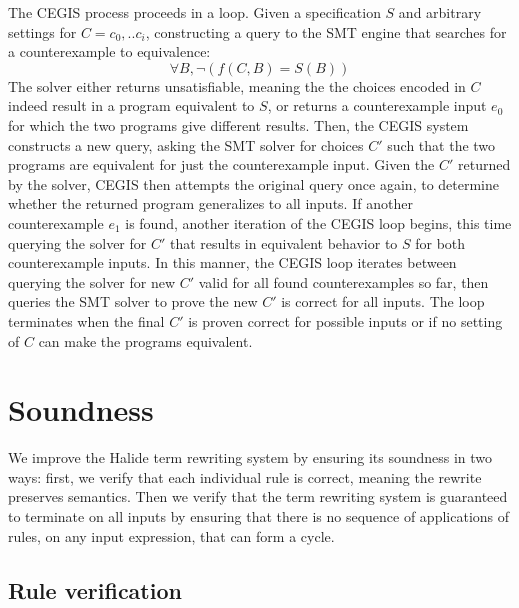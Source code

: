 \documentclass[sigplan,10pt,review,anonymous]{acmart}\settopmatter{printfolios=true,printccs=false,printacmref=false}
\begin{document}
The CEGIS process proceeds in a loop. Given a specification $S$ and arbitrary
settings for $C = {c_0,..c_i}$, constructing a query to the SMT engine that searches for
a counterexample to equivalence:
$$\forall B, \neg (f(C, B) = S(B))$$
The solver either returns unsatisfiable, meaning the the choices encoded in $C$
indeed result in a program equivalent to $S$, or returns a counterexample input $e_0$
for which the two programs give different results.  Then, the CEGIS system constructs a new query,
asking the SMT solver for choices $C'$ such that the two programs are equivalent for just the
counterexample input.
Given the $C'$ returned by the solver, CEGIS then attempts the original query once again, to
determine whether the returned program generalizes to all inputs.
If another counterexample $e_1$ is found, another iteration of the CEGIS loop begins, this time querying
the solver for $C'$ that results in equivalent behavior to $S$ for both counterexample inputs.
In this manner, the CEGIS loop iterates between querying the solver for new $C'$ valid
for all found counterexamples so far, then queries the SMT solver to prove the new $C'$ is
correct for all inputs.  The loop terminates when the final $C'$ is proven correct for
possible inputs or if no setting of $C$ can make the programs equivalent.

\section{Soundness}
\label{sec:soundness}

We improve the Halide term rewriting system by ensuring its soundness in
two ways: first, we verify that each individual rule is correct, meaning the
rewrite preserves semantics. Then we verify that the term rewriting system is
guaranteed to terminate on all inputs by ensuring that there is no sequence of
applications of rules, on any input expression, that can form a cycle.

\subsection{Rule verification}
\end{document}
